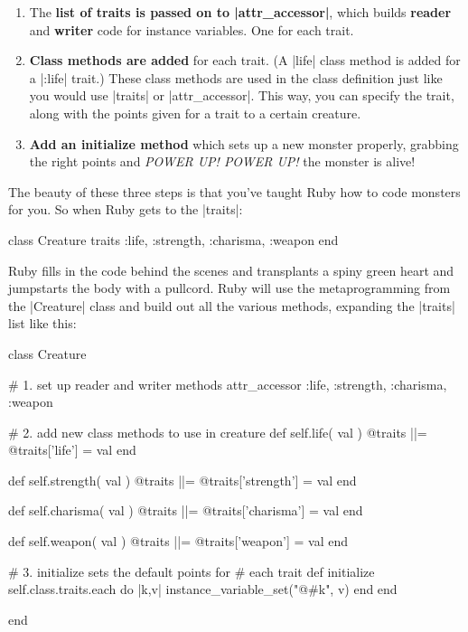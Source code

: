 \documentclass[12pt,twoside]{report}
\begin{document}
\begin{enumerate}
\item The {\bf list of traits is passed on to
  \rubyinline|attr_accessor|}, which builds {\bf
  reader} and {\bf writer} code for instance variables.  One for each
  trait.
\item {\bf Class methods are added} for each trait.  (A
  \rubyinline|life| class method is added for a
  \rubyinline|:life| trait.)  These class methods are
  used in the class definition just like you would use
  \rubyinline|traits| or
  \rubyinline|attr_accessor|.  This way, you can
  specify the trait, along with the points given for a trait to a
  certain creature.
\item {\bf Add an initialize method} which sets up a new monster
  properly, grabbing the right points and {\em POWER UP! POWER UP!}
  the monster is alive!
\end{enumerate}

The beauty of these three steps is that you've taught Ruby how to code
monsters for you.  So when Ruby gets to the
\rubyinline|traits|:


\begin{rubycode}

 class Creature
   traits :life, :strength, :charisma, :weapon
 end

\end{rubycode}


Ruby fills in the code behind the scenes and transplants a spiny green
heart and jumpstarts the body with a pullcord. Ruby will use the
metaprogramming from the \rubyinline|Creature| class
and build out all the various methods, expanding the
\rubyinline|traits| list like this:


\begin{rubycode}

 class Creature

   # 1. set up reader and writer methods
   attr_accessor :life, :strength, :charisma, :weapon

   # 2. add new class methods to use in creature
   def self.life( val )
     @traits ||= {}
     @traits['life'] = val
   end

   def self.strength( val )
     @traits ||= {}
     @traits['strength'] = val
   end

   def self.charisma( val )
     @traits ||= {}
     @traits['charisma'] = val
   end

   def self.weapon( val )
     @traits ||= {}
     @traits['weapon'] = val
   end

   # 3. initialize sets the default points for
   #    each trait
   def initialize
     self.class.traits.each do |k,v|
       instance_variable_set("@#{k}", v)
     end
   end

 end

\end{rubycode}
\end{document}

